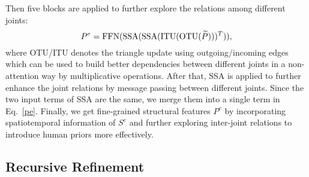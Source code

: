 \documentclass{article}
\begin{document}
Then five blocks are applied to further explore the relations among different joints:\begin{equation}\label{pe}
    P^e = {\rm FFN}({\rm SSA}({\rm SSA}({\rm ITU}({\rm OTU}(\widetilde P)))^T)),
\end{equation}
where OTU/ITU denotes the triangle update using outgoing/incoming edges~\cite{jumper2021highly} which can be used to build better dependencies between different joints in a non-attention way by multiplicative operations. After that, SSA is applied to further enhance the joint relations by message passing between different joints. Since the two input terms of SSA are the same, we merge them into a single term in Eq.~\ref{pe}. Finally, we get fine-grained structural features $P^e$ by incorporating spatiotemporal information of $S^e$ and further exploring inter-joint relations to introduce human priors more effectively.\vspace{-0.3em}

\fi

\subsection{Recursive Refinement}\vspace{-0.2em}
\end{document}
